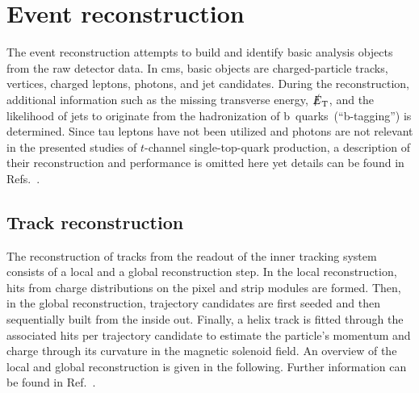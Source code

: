 \chapter{Event reconstruction}
\label{ch:reconstruction}


The event reconstruction attempts to build and identify basic analysis objects from the raw detector data. In \gls{cms}, basic objects are charged-particle tracks, vertices, charged leptons, photons, and jet candidates. During the reconstruction, additional information such as the missing transverse energy, $\slashed{E}_{\textrm{T}}$, and the likelihood of jets to originate from the hadronization of b~quarks~(``b-tagging'') is determined. Since tau leptons have not been utilized and photons are not relevant in the presented studies of $t$-channel single-top-quark production, a description of their reconstruction and performance is omitted here yet details can be found in Refs.~\cite{Khachatryan:2015dfa,Khachatryan:2015iwa}.


\section{Track reconstruction}
\label{sec:reconstruction-track}

The reconstruction of tracks from the readout of the inner tracking system consists of a local and a global reconstruction step. In the local reconstruction, hits from charge distributions on the pixel and strip modules are formed. Then, in the global reconstruction, trajectory candidates are first seeded and then sequentially built from the inside out. Finally, a helix track is fitted through the associated hits per trajectory candidate to estimate the particle's momentum and charge through its curvature in the magnetic solenoid field. An overview of the local and global reconstruction is given in the following. Further information can be found in Ref.~\cite{Chatrchyan:2014fea}.

